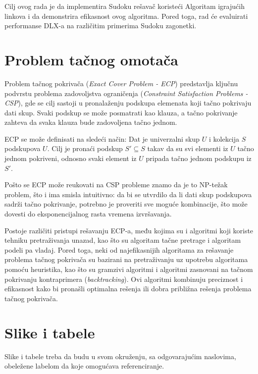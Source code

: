 \documentclass[a4paper]{article}
\begin{document}
{Cilj ovog rada je da implementira Sudoku rešavač koristeći Algoritam igrajućih linkova i da
demonstrira efikasnost ovog algoritma. Pored toga, rad će evaluirati performanse DLX-a na
različitim primerima Sudoku zagonetki.

\section{Problem tačnog omotača}

Problem tačnog pokrivača ({\em Exact Cover Problem - ECP}) predstavlja ključnu podvrstu problema
zadovoljstva ograničenja ({\em Constraint Satisfaction Problems - CSP}), gde se cilj sastoji u
pronalaženju podskupa elemenata koji tačno pokrivaju dati skup. Svaki podskup se može posmatrati
kao klauza, a tačno pokrivanje zahteva da svaka klauza bude zadovoljena tačno jednom.

ECP se može definisati na sledeći način: Dat je univerzalni skup \( U \)
i kolekcija \( S \) podskupova \( U \). Cilj je pronaći podskup \( S' \subseteq S \) takav
da su svi elementi iz \( U \) tačno jednom pokriveni, odnosno svaki element iz \( U \) pripada
tačno jednom podskupu iz \( S' \).

Pošto se ECP može reukovati na CSP probleme \cite{reduction} znamo da je to NP-težak problem,
što i ima smisla intuitivno: da bi se utvrdilo da li dati skup podskupova sadrži tačno pokrivanje,
potrebno je proveriti sve moguće kombinacije, što može dovesti do eksponencijalnog rasta vremena izvršavanja.

Postoje različiti pristupi rešavanju ECP-a, među kojima su i algoritmi koji koriste tehniku pretraživanja
unazad, kao što su algoritam tačne pretrage i algoritam podeli pa vladaj. Pored toga, neki od najefikasnijih
algoritama za rešavanje problema tačnog pokrivača su bazirani na pretraživanju uz upotrebu algoritama pomoću
heuristika, kao što su gramzivi algoritmi i algoritmi zasnovani na tačnom pokrivanju kontraprimera ({\em backtracking}).
Ovi algoritmi kombinuju preciznost i efikasnost kako bi pronašli optimalna rešenja ili dobra približna rešenja problema
tačnog pokrivača.

\section{Slike i tabele}
\label{slike_i_tabele}

Slike i tabele treba da budu u svom okruženju, sa odgovarajućim naslovima, obeležene labelom da koje omogućava referenciranje. 

}
\end{document}
